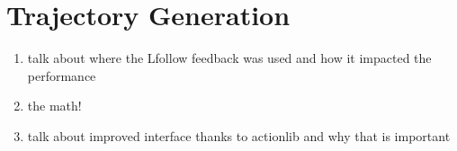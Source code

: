 \section{Trajectory Generation}

\begin{enumerate}
\item talk about where the Lfollow feedback was used and how it impacted the performance
\item the math!
\item talk about improved interface thanks to actionlib and why that is important

\end{enumerate}

